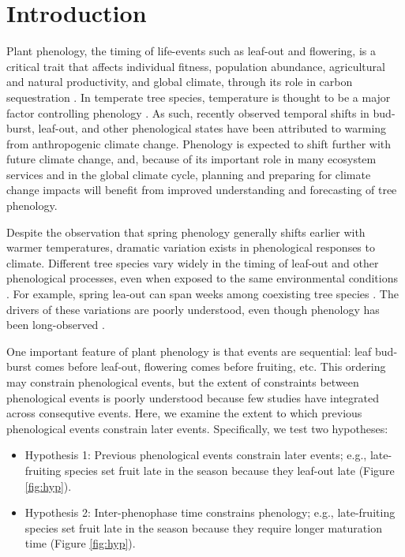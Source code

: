 \documentclass{article}
\begin{document}
\section* {Introduction}
Plant phenology, the timing of life-events such as leaf-out and flowering, is a critical trait that affects individual fitness, population abundance, agricultural and natural productivity, and global climate, through its role in carbon sequestration \citep{miller-rushing2008,primack2009a,willis2010,miller-rushing2010}. In temperate tree species, temperature is thought to be a major factor controlling phenology \citep{parmesan2006, morin2010,schwartz2013}. As such, recently observed temporal shifts in bud-burst, leaf-out, and other phenological states have been attributed to warming from anthropogenic climate change\citep{parmesan2006}. Phenology is expected to shift further with future climate change, and, because of its important role in many ecosystem services and in the global climate cycle, planning and preparing for climate change impacts will benefit from improved understanding and forecasting of tree phenology.
\par Despite the observation that spring phenology generally shifts earlier with warmer temperatures, dramatic variation exists in phenological responses to climate. Different tree species vary widely in the timing of leaf-out and other phenological processes, even when exposed to the same environmental conditions \citep{lechowicz1984,primack2009c}. For example, spring lea-out can span weeks among coexisting tree species \citep{lechowicz1984}. The drivers of these variations are poorly understood, even though phenology has been long-observed \citep{wolkovich2014}.
\par One important feature of plant phenology is that events are sequential: leaf bud-burst comes before leaf-out, flowering comes before fruiting, etc. This ordering may constrain phenological events, but the extent of constraints between phenological events is poorly understood because few studies have integrated across consequtive events. Here, we examine the extent to which previous phenological events constrain later events. Specifically, we test two hypotheses:
\begin{itemize}
\item Hypothesis 1: Previous phenological events constrain later events; e.g., late-fruiting species set fruit late in the season because they leaf-out late  (Figure \ref{fig:hyp}).
\item Hypothesis 2: Inter-phenophase time  constrains phenology; e.g., late-fruiting species set fruit late in the season because they require longer maturation time (Figure \ref{fig:hyp}).
\end{itemize}
\end{document}
